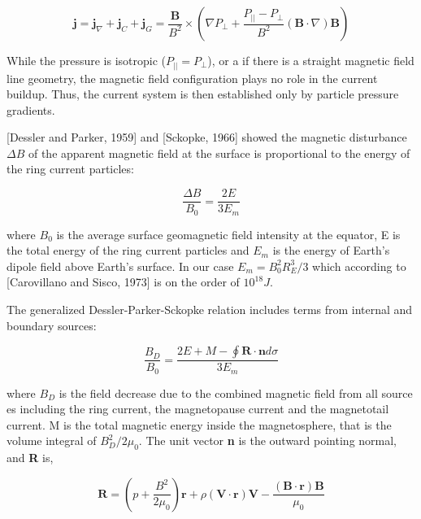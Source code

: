 \documentclass[utf8]{report}
\begin{document}
\begin{equation}
    \textbf{j} = \textbf{j}_{\nabla} + \textbf{j}_{C} + \textbf{j}_{G} = \frac{\textbf{B}}{B^{2}} \times (\nabla P_{\perp} + \frac{P_{||} - P_{\perp}}{B^{2}}(\textbf{B} \cdot \nabla) \textbf{B})
    \label{eq:RC4}
\end{equation}

While the pressure is isotropic ($P_{||} = P_{\perp}$), or a if there is a straight magnetic field line geometry, the magnetic field configuration plays no role in the current buildup. Thus, the current system is then established only by particle pressure gradients. 

[Dessler and Parker, 1959] and [Sckopke, 1966] showed the magnetic disturbance $\Delta B$ of the apparent magnetic field at the surface is proportional to the energy of the ring current particles: 

\begin{equation}
    \frac{\Delta B}{B_{0}} = \frac{2E}{3E_{m}}
    \label{eq:RC5}
\end{equation}

where $B_{0} $ is the average surface geomagnetic field intensity at the equator, E is the total energy of the ring current particles and $E_{m}$ is the energy of Earth's dipole field above Earth's surface. In our case $E_{m} = B^{2}_{0} R^{3}_{E}/3$ which according to [Carovillano and Sisco, 1973] is on the order of $10^{18} J$. 

The generalized Dessler-Parker-Sckopke relation includes terms from internal and boundary sources: 

\begin{equation}
    \frac{B_{D}}{B_{0}} = \frac{2E + M - \oint \textbf{R} \cdot \textbf{n} d\sigma}{3E_{m}}
    \label{eq:RC6}
\end{equation}

where $B_{D}$ is the field decrease due to the combined magnetic field from all source es including the ring current, the magnetopause current and the magnetotail current. M is the total magnetic energy inside the magnetosphere, that is the volume integral of $B_{D}^{2} / 2 \mu_{0}$. The unit vector \textbf{n} is the outward pointing normal, and \textbf{R} is, 

\begin{equation}
    \textbf{R} = (p+\frac{B^{2}}{2\mu_{0}})\textbf{r} + \rho (\textbf{V} \cdot \textbf{r})\textbf{V} - \frac{(\textbf{B} \cdot \textbf{r})\textbf{B}}{\mu_{0}}
    \label{eq:RC7}
\end{equation}
\end{document}
